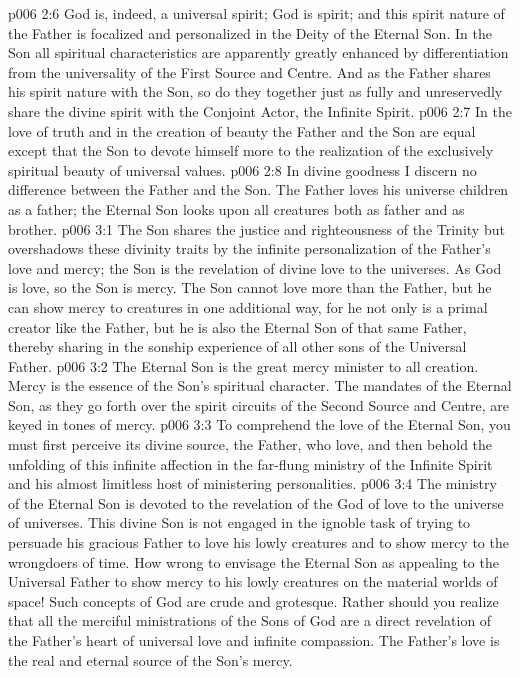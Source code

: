 \vs p006 2:6 God is, indeed, a universal spirit; God is spirit; and this spirit nature of the Father is focalized and personalized in the Deity of the Eternal Son. In the Son all spiritual characteristics are apparently greatly enhanced by differentiation from the universality of the First Source and Centre. And as the Father shares his spirit nature with the Son, so do they together just as fully and unreservedly share the divine spirit with the Conjoint Actor, the Infinite Spirit.
\vs p006 2:7 In the love of truth and in the creation of beauty the Father and the Son are equal except that the Son  to devote himself more to the realization of the exclusively spiritual beauty of universal values.
\vs p006 2:8 In divine goodness I discern no difference between the Father and the Son. The Father loves his universe children as a father; the Eternal Son looks upon all creatures both as father and as brother.
\vs p006 3:1 The Son shares the justice and righteousness of the Trinity but overshadows these divinity traits by the infinite personalization of the Father’s love and mercy; the Son is the revelation of divine love to the universes. As God is love, so the Son is mercy. The Son cannot love more than the Father, but he can show mercy to creatures in one additional way, for he not only is a primal creator like the Father, but he is also the Eternal Son of that same Father, thereby sharing in the sonship experience of all other sons of the Universal Father.
\vs p006 3:2 The Eternal Son is the great mercy minister to all creation. Mercy is the essence of the Son’s spiritual character. The mandates of the Eternal Son, as they go forth over the spirit circuits of the Second Source and Centre, are keyed in tones of mercy.
\vs p006 3:3 To comprehend the love of the Eternal Son, you must first perceive its divine source, the Father, who  love, and then behold the unfolding of this infinite affection in the far\hyp{}flung ministry of the Infinite Spirit and his almost limitless host of ministering personalities.
\vs p006 3:4 The ministry of the Eternal Son is devoted to the revelation of the God of love to the universe of universes. This divine Son is not engaged in the ignoble task of trying to persuade his gracious Father to love his lowly creatures and to show mercy to the wrongdoers of time. How wrong to envisage the Eternal Son as appealing to the Universal Father to show mercy to his lowly creatures on the material worlds of space! Such concepts of God are crude and grotesque. Rather should you realize that all the merciful ministrations of the Sons of God are a direct revelation of the Father’s heart of universal love and infinite compassion. The Father’s love is the real and eternal source of the Son’s mercy.
